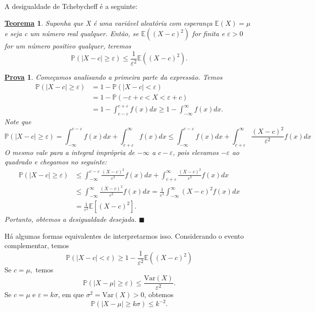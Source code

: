 \documentclass{article}
\newtheorem*{theorem*}{\underline{Teorema}}
\newtheorem*{proof*}{\underline{Prova}}
\renewcommand\qedsymbol{$\blacksquare$}
\begin{document}
  A desigualdade de Tchebycheff é a seguinte: 
\begin{theorem*}
  Suponha que X é uma variável aleatória
com esperança \(\mathbb{E}(X) = \mu\) e seja c um número real qualquer. Então, se \(\mathbb{E}((X-c)^{2})\)
for finita e \(\varepsilon >0\) for um número positivo qualquer, teremos 
  \[
    \mathbb{P}(|X-c|\geq \varepsilon )\leq \frac{1}{\varepsilon ^{2}}\mathbb{E}((X-c)^{2}).
  \]
\end{theorem*}
\begin{proof*}
Começamos analisando a primeira parte da expressão. Temos
\begin{align*}
  \mathbb{P}(|X-c|\geq \varepsilon )& = 1 - \mathbb{P}(|X-c| < \varepsilon )\\
                                    & = 1 - \mathbb{P}(-\varepsilon + c < X < \varepsilon + c)\\
                                    & = 1 - \int_{c-\varepsilon }^{c+\varepsilon }f(x)dx\geq 1 - \int_{-\infty}^{\infty}f(x)dx.
\end{align*}
  Note que  
  \[
    \mathbb{P}(|X-c|\geq \varepsilon ) = \int_{-\infty}^{c-\varepsilon }f(x)dx + \int_{c+\varepsilon }^{\infty}f(x)dx\leq \int_{-\infty}^{c-\varepsilon }f(x)dx + \int_{c+\varepsilon }^{\infty}\frac{(X-c)^{2}}{\varepsilon ^{2}}f(x)dx
  \]
  O mesmo vale para a integral imprópria de \(-\infty\) a \(c-\varepsilon \), pois elevamos \(-\varepsilon \) ao quadrado e chegamos no seguinte:
 \begin{align*}
   \mathbb{P}(|X-c|\geq \varepsilon )&\leq \int_{-\infty}^{c-\varepsilon }\frac{(X-c)^{2}}{\varepsilon ^{2}}f(x)dx + \int_{c+\varepsilon }^{\infty}\frac{(X-c)^{2}}{\varepsilon ^{2}}f(x)dx\\
                                     &\leq \int_{-\infty}^{\infty}\frac{(X-c)^{2}}{\varepsilon ^{2}}f(x)dx = \frac{1}{\varepsilon ^{2}}\int_{-\infty}^{\infty}(X-c)^{2}f(x)dx\\
                                     &= \frac{1}{\varepsilon ^{2}}\mathbb{E}[(X-c)^{2}].
 \end{align*}
 Portanto, obtemos a desigualdade desejada. \qedsymbol
\end{proof*}
  Há algumas formas equivalentes de interpretarmos isso. 
Considerando o evento complementar, temos 
  \[
    \mathbb{P}(|X-c|< \varepsilon )\geq 1 - \frac{1}{\varepsilon ^{2}}\mathbb{E}((X-c)^{2})
  \]
Se \(c = \mu,\) temos 
  \[
    \mathbb{P}(|X-\mu|\geq \varepsilon )\leq \frac{\mathrm{Var}(X)}{\varepsilon ^{2}}.
  \]
Se \(c=\mu\) e \(\varepsilon = k\sigma \), em que \(\sigma ^{2}=\mathrm{Var}(X) > 0\), obtemos 
  \[
    \mathbb{P}(|X-\mu|\geq k\sigma )\leq k^{-2}.
  \]
\end{document}
